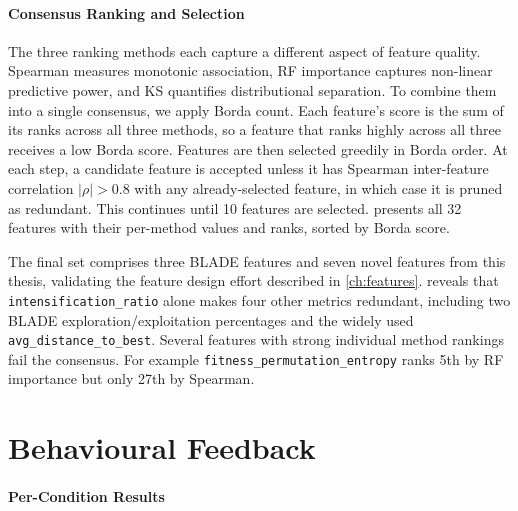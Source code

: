 \paragraph{Consensus Ranking and Selection}
\label{sec:results-selection}

The three ranking methods each capture a different aspect of feature quality. Spearman measures monotonic association, RF importance captures non-linear predictive power, and KS quantifies distributional separation. To combine them into a single consensus, we apply Borda count. Each feature's score is the sum of its ranks across all three methods, so a feature that ranks highly across all three receives a low Borda score. Features are then selected greedily in Borda order. At each step, a candidate feature is accepted unless it has Spearman inter-feature correlation $|\rho| > 0.8$ with any already-selected feature, in which case it is pruned as redundant. This continues until 10 features are selected.  presents all 32 features with their per-method values and ranks, sorted by Borda score.

The final set comprises three BLADE features and seven novel features from this thesis, validating the feature design effort described in \cref{ch:features}.  reveals that \texttt{intensification\_ratio} alone makes four other metrics redundant, including two BLADE exploration/exploitation percentages and the widely used \texttt{avg\_distance\_to\_best}. Several features with strong individual method rankings fail the consensus. For example \texttt{fitness\_permutation\_entropy} ranks 5th by RF importance but only 27th by Spearman.

\section{Behavioural Feedback}
\label{sec:results-feedback}

\paragraph{Per-Condition Results}
\label{sec:results-conditions}

